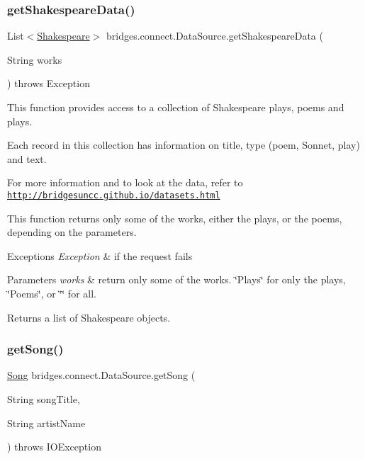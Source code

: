 \subsubsection{\texorpdfstring{get\+Shakespeare\+Data()}{getShakespeareData()}\hspace{0.1cm}{\footnotesize\ttfamily [2/2]}}
{\footnotesize\ttfamily List$<$\hyperlink{classbridges_1_1data__src__dependent_1_1_shakespeare}{Shakespeare}$>$ bridges.\+connect.\+Data\+Source.\+get\+Shakespeare\+Data (\begin{DoxyParamCaption}\item[{String}]{works }\end{DoxyParamCaption}) throws Exception}



This function provides access to a collection of Shakespeare plays, poems and plays. 

Each record in this collection has information on title, type (poem, Sonnet, play) and text.

For more information and to look at the data, refer to \href{http://bridgesuncc.github.io/datasets.html}{\tt http\+://bridgesuncc.\+github.\+io/datasets.\+html}

This function returns only some of the works, either the plays, or the poems, depending on the parameters.


\begin{DoxyExceptions}{Exceptions}
{\em Exception} & if the request fails\\
\hline
\end{DoxyExceptions}

\begin{DoxyParams}{Parameters}
{\em works} & return only some of the works. \char`\"{}\+Plays\char`\"{} for only the plays, \char`\"{}\+Poems\char`\"{}, or \char`\"{}\char`\"{} for all.\\
\hline
\end{DoxyParams}
\begin{DoxyReturn}{Returns}
a list of Shakespeare objects. 
\end{DoxyReturn}
\mbox{\label{classbridges_1_1connect_1_1_data_source_a935ea2005b7de3cb22c1e55027b81460}} 
\subsubsection{\texorpdfstring{get\+Song()}{getSong()}}
{\footnotesize\ttfamily \hyperlink{classbridges_1_1data__src__dependent_1_1_song}{Song} bridges.\+connect.\+Data\+Source.\+get\+Song (\begin{DoxyParamCaption}\item[{String}]{song\+Title,  }\item[{String}]{artist\+Name }\end{DoxyParamCaption}) throws I\+O\+Exception}

